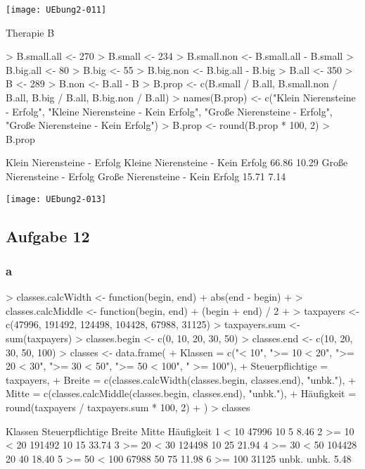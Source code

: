 \documentclass{article}
\begin{document}
\texttt{[image: UEbung2-011]}



Therapie B

\begin{Schunk}
\begin{Sinput}
> B.small.all <- 270
> B.small <- 234
> B.small.non <- B.small.all - B.small
> B.big.all <- 80
> B.big <- 55
> B.big.non <- B.big.all - B.big
> B.all <- 350
> B <- 289
> B.non <- B.all - B
> B.prop <- c(B.small / B.all, B.small.non / B.all, B.big / B.all, B.big.non / B.all)
> names(B.prop) <- c("Klein Nierensteine - Erfolg", "Kleine Nierensteine - Kein Erfolg", "Große Nierensteine - Erfolg", "Große Nierensteine - Kein Erfolg")
> B.prop <- round(B.prop * 100, 2)
> B.prop
\end{Sinput}
\begin{Soutput}
      Klein Nierensteine - Erfolg Kleine Nierensteine - Kein Erfolg 
                            66.86                             10.29 
      Große Nierensteine - Erfolg  Große Nierensteine - Kein Erfolg 
                            15.71                              7.14 
\end{Soutput}
\end{Schunk}

\texttt{[image: UEbung2-013]}

\subsection{Aufgabe 12}
\subsubsection{a}

\begin{Schunk}
\begin{Sinput}
> classes.calcWidth <- function(begin, end){
+   abs(end - begin)
+ }
> classes.calcMiddle <- function(begin, end){
+   (begin + end) / 2
+ }
> taxpayers <- c(47996, 191492, 124498, 104428, 67988, 31125)
> taxpayers.sum <- sum(taxpayers)
> classes.begin <- c(0, 10, 20, 30, 50)
> classes.end <- c(10, 20, 30, 50, 100)
> classes <- data.frame(
+   Klassen = c("< 10", ">= 10 < 20", ">= 20 < 30", ">= 30 < 50", ">= 50 < 100", " >= 100"),
+   Steuerpflichtige = taxpayers,
+   Breite = c(classes.calcWidth(classes.begin, classes.end), "unbk."),
+   Mitte = c(classes.calcMiddle(classes.begin, classes.end), "unbk."),
+   Häufigkeit = round(taxpayers / taxpayers.sum * 100, 2)
+ )
> classes
\end{Sinput}
\begin{Soutput}
      Klassen Steuerpflichtige Breite Mitte Häufigkeit
1        < 10            47996     10     5       8.46
2  >= 10 < 20           191492     10    15      33.74
3  >= 20 < 30           124498     10    25      21.94
4  >= 30 < 50           104428     20    40      18.40
5 >= 50 < 100            67988     50    75      11.98
6      >= 100            31125  unbk. unbk.       5.48
\end{Soutput}
\end{Schunk}
\end{document}
